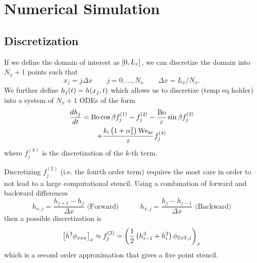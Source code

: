 \section{Numerical Simulation}
\subsection{Discretization}
\begin{frame}
    If we define the domain of interest as $\left[ 0, L_x \right]$, we can discretize the 
    domain into $N_x + 1$ points such that
    \begin{equation*}
        x_j = j\Delta x \quad \quad j = 0, \ldots, N_x \quad \quad \Delta x = L_x / N_x. 
    \end{equation*}
    We further define $h_j\!\left( t \right) = h\!\left( x_j, t \right)$ which allows us to discretize 
    (temp eq holder) into a system of $N_x + 1$ ODEs of the form 
    \begin{multline}
        \frac{d h_j}{d t} = \mathrm{Bo}\cos \beta f_j^{(1)} - f_j^{(2)} -  \frac{\mathrm{Bo}}{\varepsilon} \sin \beta f_j^{(3)} 
        \\ + \frac{k_i \left( 1 + \alpha_1^2 \right) \mathrm{We_{ac}}}{\varepsilon} f_j^{(4)}
        \label{eq:ode_sys}
    \end{multline}
    where $f_j^{(k)}$ is the discretization of the $k$-th term. 
\end{frame}
\begin{frame}
    Discretizing $f_j^{(2)}$ (i.e. the fourth order term) requires the most care 
    in order to not lead to a large computational stencil. Using a combination of forward
    and backward differences
    \begin{equation*}
        h_{x, j} = \frac{h_{j+1} - h_j}{\Delta x} \text{ (Forward)} \quad \quad \quad h_{\overline{x}, j} = \frac{h_{j} - h_{j-1}}{\Delta x} \text{ (Backward)}
    \end{equation*}
    then a possible discretization is 
    \begin{equation*}
        \left[ h^3\phi_{xxx} \right]_x \approx f_j^{\left( 2 \right)} = \left( \frac{1}{2}\left( h_{i-1}^3 + h_i^3 \right) \phi_{\overline{x}x\overline{x}, j} \right)_{x}
    \end{equation*}
    which is a second order approximation that gives a five point stencil. 
\end{frame}
